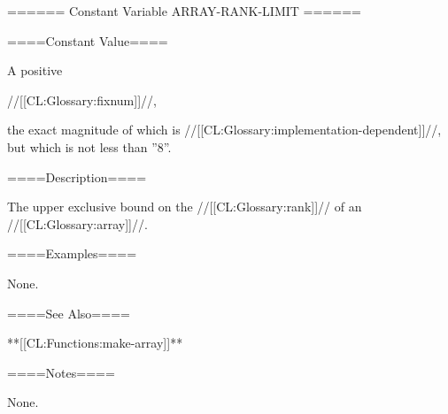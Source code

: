 ====== Constant Variable ARRAY-RANK-LIMIT ======

====Constant Value====

A positive

//[[CL:Glossary:fixnum]]//,

the exact magnitude of which is //[[CL:Glossary:implementation-dependent]]//, but which is not less than ''8''.

====Description====

The upper exclusive bound on the //[[CL:Glossary:rank]]// of an //[[CL:Glossary:array]]//.

====Examples====

None.

====See Also====

**[[CL:Functions:make-array]]**

====Notes====

None.

